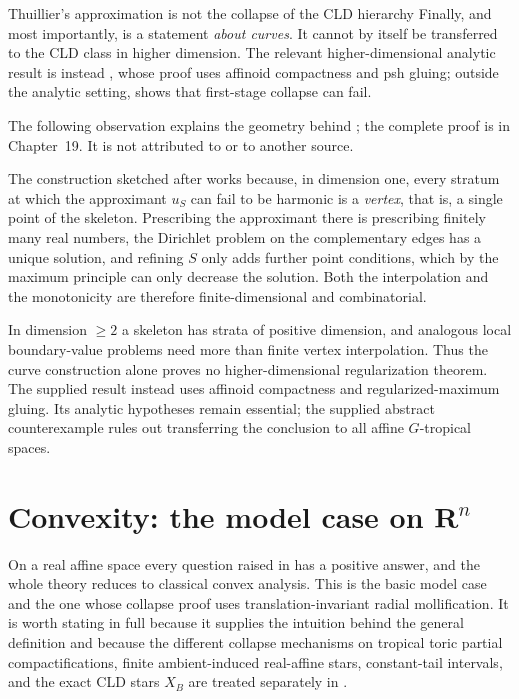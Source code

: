 \begin{warning}{Thuillier's approximation is not the collapse of the CLD
hierarchy}
Finally, and most importantly,  is a
statement \emph{about curves}.  It cannot by itself be transferred to the
CLD class in higher dimension.  The relevant higher-dimensional analytic
result is instead , whose proof
uses affinoid compactness and psh gluing; outside the analytic setting,
 shows that first-stage collapse
can fail.
\end{warning}

\begin{remark}
\label{rem:ch15-thuillier-dimension-one}
The following observation explains the geometry behind
; the complete proof is in
Chapter~19.  It is not attributed to \cite{Thu05} or to another source.

The construction sketched after
 works because, in dimension one,
every stratum at which the approximant $u_S$ can fail to be harmonic is a
\emph{vertex}, that is, a single point of the skeleton.  Prescribing the
approximant there is prescribing finitely many real numbers, the Dirichlet
problem on the complementary edges has a unique solution, and refining $S$
only adds further point conditions, which by the maximum principle can only
decrease the solution.  Both the interpolation and the monotonicity are
therefore finite-dimensional and combinatorial.

In dimension $\ge2$ a skeleton has strata of positive dimension, and
analogous local boundary-value problems need more than finite vertex
interpolation.  Thus the curve construction alone proves no
higher-dimensional regularization theorem.  The supplied result
 instead uses affinoid
compactness and regularized-maximum gluing.  Its analytic hypotheses remain
essential; the supplied abstract counterexample rules out transferring the
conclusion to all affine $G$-tropical spaces.
\end{remark}

\section{Convexity: the model case on \texorpdfstring{$\mathbf R^n$}{Rn}}
\label{sec:ch15-convexity}

On a real affine space every question raised in  has
a positive answer, and the whole theory reduces to classical convex analysis.
This is the basic model case and the one whose collapse proof uses
translation-invariant radial mollification.  It is worth stating in full
because it supplies the intuition behind the general definition and because
the different collapse mechanisms on tropical toric partial compactifications,
finite ambient-induced real-affine stars, constant-tail intervals, and the
exact CLD stars $X_B$ are treated separately in
.

